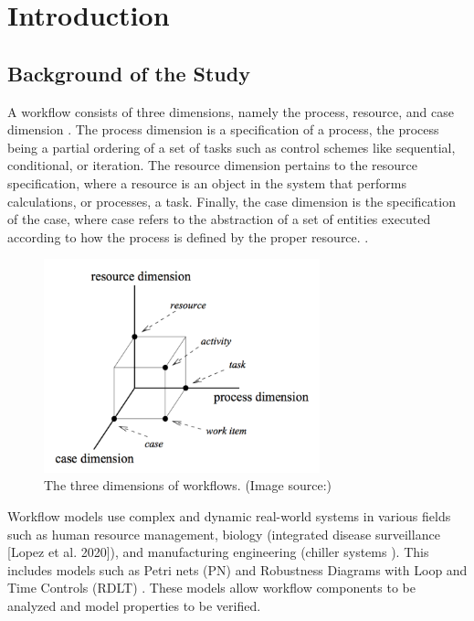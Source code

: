 \chapter{Introduction}
\label{chap:intro}
\section{Background of the Study}
A workflow consists of three dimensions, namely the process, resource, and case dimension \cite{hollingsworth}.  The process dimension is a specification of a process, the process being a partial ordering of a set of tasks such as control schemes like sequential, conditional, or iteration. The resource dimension pertains to the resource specification, where a resource is an object in the system that performs calculations, or processes, a task. Finally, the case dimension is the specification of the case, where case refers to the abstraction of a set of entities executed according to how the process is defined by the proper resource. \cite{Aalst1996} \cite{Malinao2017}.

\begin{figure}
    \centering
    \includegraphics[width=8cm]{../figures/Workflow Dimensions.png}
    \caption{The three dimensions of workflows. (Image source:\cite{Malinao2017})}
    \label{WorkflowDimensions}
\end{figure}

Workflow models use complex and dynamic real-world systems in various fields such as human resource management,  biology (integrated disease surveillance [Lopez et al. 2020]),  and manufacturing engineering (chiller systems \cite{Ramirez2024}). This includes models such as Petri nets (PN) and Robustness Diagrams with Loop and Time Controls (RDLT) \cite{Malinao2017}. These models allow workflow components to be analyzed and model properties to be verified. \\

